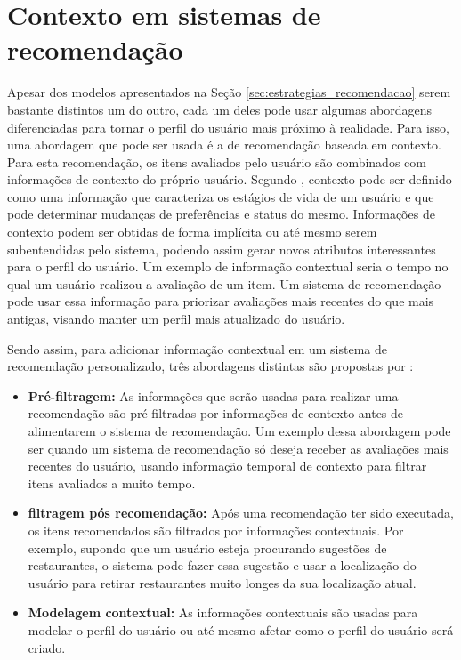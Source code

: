 \section{Contexto em sistemas de recomendação}

Apesar dos modelos apresentados na Seção \ref{sec:estrategias_recomendacao}
serem bastante distintos um do outro, cada um deles pode usar algumas
abordagens diferenciadas para tornar o perfil do usuário mais próximo à
realidade. Para isso, uma abordagem que pode ser usada é a de recomendação
baseada em contexto. Para esta recomendação, os itens avaliados pelo usuário são
combinados com informações de contexto do próprio usuário. Segundo ,
contexto pode ser definido como uma informação que caracteriza os estágios de
vida de um usuário e que pode determinar mudanças de preferências e status
do mesmo. Informações de contexto podem ser obtidas de forma implícita ou até
mesmo serem subentendidas pelo sistema, podendo assim gerar novos atributos
interessantes para o perfil do usuário. Um exemplo de informação contextual
seria o tempo no qual um usuário realizou a avaliação de um item. Um sistema de
recomendação pode usar essa informação para priorizar avaliações mais recentes
do que mais antigas, visando manter um perfil mais atualizado do usuário.

Sendo assim, para adicionar informação contextual em um sistema de recomendação
personalizado, três abordagens distintas são propostas por
:

\begin{itemize}
    \item \textbf{Pré-filtragem: } As informações que serão usadas
        para realizar uma recomendação são pré-filtradas por informações de
        contexto antes de alimentarem o sistema de recomendação. Um exemplo
        dessa abordagem pode ser quando um sistema de recomendação só deseja
        receber as avaliações mais recentes do usuário, usando informação
        temporal de contexto para filtrar itens avaliados a muito tempo.
    \item \textbf{filtragem pós recomendação: } Após uma recomendação ter sido
        executada, os itens recomendados são filtrados por informações
        contextuais. Por exemplo, supondo que um usuário esteja procurando
        sugestões de restaurantes, o sistema pode fazer essa sugestão e usar a
        localização do usuário para retirar restaurantes muito longes da sua
        localização atual.
    \item \textbf{Modelagem contextual: } As informações contextuais são usadas
        para modelar o perfil do usuário ou até mesmo afetar como o perfil do
        usuário será criado.
\end{itemize}

